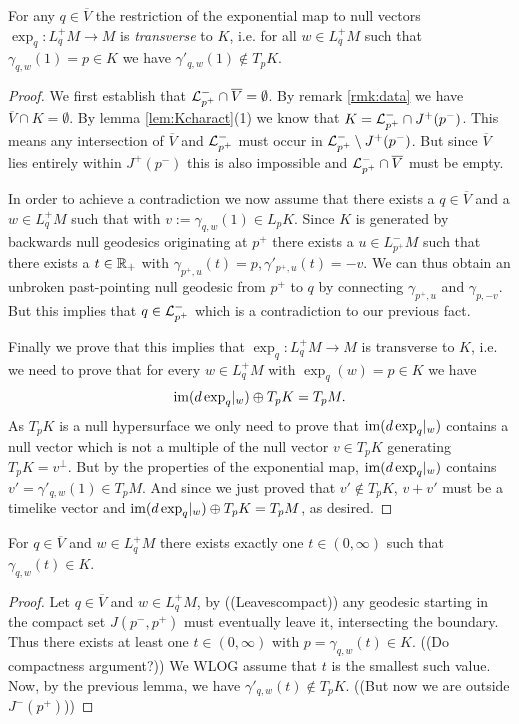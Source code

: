 \begin{lemma}\label{prop:transversality}
For any $q\in \overline{V}$ the restriction of the exponential map to null vectors $\exp_q:L^+_qM\to M$ is \emph{transverse} to $K$, i.e. for all $w\in L^+_qM$ such that $\gamma_{q,w}(1) = p\in K$ we have $\gamma'_{q,w}(1)\notin T_pK$.
\end{lemma}
\begin{proof}
    We first establish that $\mathcal{L}^-_{p^+} \cap \overline{V} = \emptyset$. By remark \ref{rmk:data} we have $\overline{V}\cap K = \emptyset$. By lemma \ref{lem:Kcharact}(1) we know that $K=\mathcal{L}^-_{p^+}\cap J^+(p^-)$. This means any intersection of $\overline{V}$ and $\mathcal{L}^-_{p^+}$ must occur in $\mathcal{L}^-_{p^+} \setminus J^+(p^-)$. But since $\overline{V}$ lies entirely within $J^+(p^-)$ this is also impossible and $\mathcal{L}^-_{p^+} \cap \overline{V}$ must be empty. 

    In order to achieve a contradiction we now assume that there exists a $q\in \overline{V}$ and a $w\in L^+_qM$ such that with $v:=\gamma_{q,w}(1)\in L_pK$.
    Since $K$ is generated by backwards null geodesics originating at $p^+$ there exists a $u\in L^-_{p^+}M$ such that there exists a $t\in \mathbb{R}_+$ with $\gamma_{p^+,u}(t)=p, \gamma'_{p^+,u}(t)=-v$. We can thus obtain an unbroken past-pointing null geodesic from $p^+$ to $q$ by connecting $\gamma_{p^+,u}$ and $\gamma_{p,-v}$. But this implies that $q\in \mathcal{L}^-_{p^+}$ which is a contradiction to our previous fact.

    Finally we prove that this implies that $\exp_q:L^+_qM\to M$ is transverse to $K$, i.e. we need to prove that for every $w\in L^+_qM$ with $\exp_q(w)=p\in K$ we have 
    \[
        \operatorname{im}(d\exp_q\rvert_w) \oplus T_pK = T_pM.
    \]
    As $T_pK$ is a null hypersurface we only need to prove that $\operatorname{im}(d\exp_q\rvert_w)$ contains a null vector which is not a multiple of the null vector $v\in T_pK$ generating $T_pK = v^\perp$. But by the properties of the exponential map, $\operatorname{im}(d\exp_q\rvert_w)$ contains $v' = \gamma'_{q,w}(1) \in T_pM$. And since we just proved that $v'\notin T_pK$, $v+v'$ must be a timelike vector and $\operatorname{im}(d\exp_q\rvert_w) \oplus T_pK = T_pM$, as desired.
\end{proof}

\begin{lemma}\label{lem:hitsonce}
    For $q\in \overline{V}$ and $w\in L^+_qM$ there exists exactly one $t\in (0,\infty)$ such that $\gamma_{q,w}(t)\in K$.
\end{lemma}
\begin{proof}
    Let $q\in \overline{V}$ and $w\in L^+_qM$, by ((Leavescompact)) any geodesic starting in the compact set $J(p^-,p^+)$ must eventually leave it, intersecting the boundary. Thus there exists at least one $t\in (0,\infty)$ with $p=\gamma_{q,w}(t)\in K$. ((Do compactness argument?)) We WLOG assume that $t$ is the smallest such value. Now, by the previous lemma, we have $\gamma'_{q,w}(t) \notin T_pK$. ((But now we are outside $J^-(p^+)$))
\end{proof}

